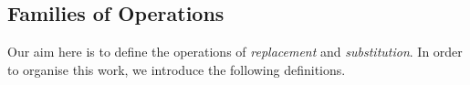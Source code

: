 
\subsection{Families of Operations}

Our aim here is to define the operations of \emph{replacement} and \emph{substitution}.  In order to organise this work, we introduce the following definitions.

